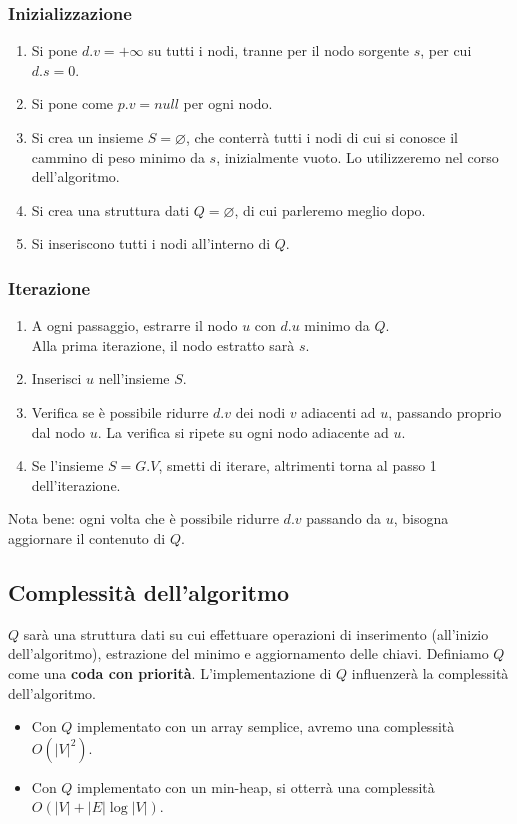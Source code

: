 \subsubsection{Inizializzazione}
\begin{enumerate}
	
	\item Si pone $d.v= +\infty$ su tutti i nodi, tranne per il nodo sorgente $s$, per cui $d.s=0$.
	
	\item Si pone come $p.v = null$ per ogni nodo.
	
	\item Si crea un insieme $S = \varnothing$, che conterrà tutti i nodi di cui si conosce il cammino di peso minimo da $s$, inizialmente vuoto. Lo utilizzeremo nel corso dell'algoritmo.
	
	\item Si crea una struttura dati $Q = \varnothing$, di cui parleremo meglio dopo.
	
	\item Si inseriscono tutti i nodi all'interno di $Q$.
\end{enumerate}

\subsubsection{Iterazione}
\begin{enumerate}
	\item A ogni passaggio, estrarre il nodo $u$ con $d.u$ minimo da $Q$.\\
	Alla prima iterazione, il nodo estratto sarà $s$.
	
	\item Inserisci $u$ nell'insieme $S$.
	
	\item Verifica se è possibile ridurre $d.v$ dei nodi $v$ adiacenti ad $u$, passando proprio dal nodo $u$. La verifica si ripete su ogni nodo adiacente ad $u$. 
	
	\item Se l'insieme $S = G.V$, smetti di iterare, altrimenti torna al passo 1 dell'iterazione.
\end{enumerate}
Nota bene: ogni volta che è possibile ridurre $d.v$ passando da $u$, bisogna aggiornare il contenuto di $Q$.


\subsection{Complessità dell'algoritmo}
$Q$ sarà una struttura dati su cui effettuare operazioni di inserimento (all'inizio dell'algoritmo), estrazione del minimo e aggiornamento delle chiavi. Definiamo $Q$ come una \textbf{coda con priorità}. L'implementazione di $Q$ influenzerà la complessità dell'algoritmo.
\begin{itemize}
	\item Con $Q$ implementato con un array semplice, avremo una complessità $O(|V|^2)$.
	\item Con $Q$ implementato con un min-heap, si otterrà una complessità $O(|V|+|E|\log|V|)$.
\end{itemize}



